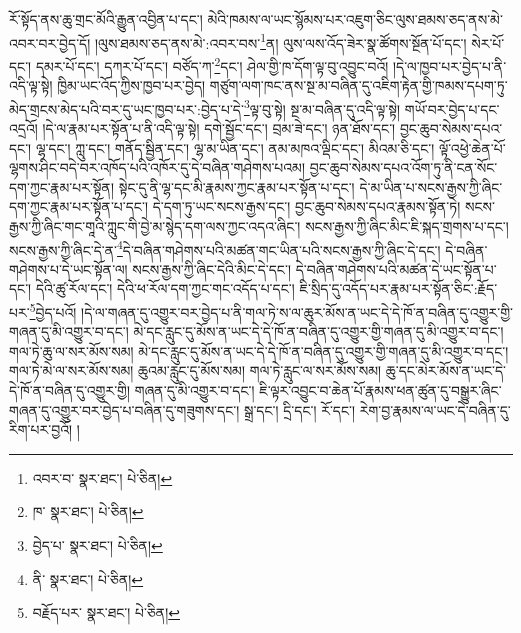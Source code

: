 རོ་སྟོད་ནས་ཆུ་གྲང་མོའི་རྒྱུན་འབྱིན་པ་དང་། མེའི་ཁམས་ལ་ཡང་སྙོམས་པར་འཇུག་ཅིང་ལུས་ཐམས་ཅད་ནས་མེ་འབར་བར་བྱེད་དོ། །ལུས་ཐམས་ཅད་ནས་མེ་:འབར་བས་\footnote{འབར་བ་  སྣར་ཐང་།  པེ་ཅིན། }ན། ལུས་ལས་འོད་ཟེར་སྣ་ཚོགས་སྔོན་པོ་དང་། སེར་པོ་དང་། དམར་པོ་དང་། དཀར་པོ་དང་། བཙོད་ཀ་\footnote{ཁ་  སྣར་ཐང་།  པེ་ཅིན། }དང་། ཤེལ་གྱི་ཁ་དོག་ལྟ་བུ་འབྱུང་བའོ། །དེ་ལ་ཁྱབ་པར་བྱེད་པ་ནི་འདི་ལྟ་སྟེ། ཁྱིམ་ཡང་འོད་ཀྱིས་ཁྱབ་པར་བྱེད། གཙུག་ལག་ཁང་ནས་སྔ་མ་བཞིན་དུ་འཇིག་རྟེན་གྱི་ཁམས་དཔག་ཏུ་མེད་གྲངས་མེད་པའི་བར་དུ་ཡང་ཁྱབ་པར་:བྱེད་པ་དེ་\footnote{བྱེད་པ་  སྣར་ཐང་།  པེ་ཅིན། }ལྟ་བུ་སྟེ། སྔ་མ་བཞིན་དུ་འདི་ལྟ་སྟེ། གཡོ་བར་བྱེད་པ་དང་འདྲའོ། །དེ་ལ་རྣམ་པར་སྟོན་པ་ནི་འདི་ལྟ་སྟེ། དགེ་སྦྱོང་དང་། བྲམ་ཟེ་དང་། ཉན་ཐོས་དང་། བྱང་ཆུབ་སེམས་དཔའ་དང་། ལྷ་དང་། ཀླུ་དང་། གནོད་སྦྱིན་དང་། ལྷ་མ་ཡིན་དང་། ནམ་མཁའ་ལྡིང་དང་། མིའམ་ཅི་དང་། ལྟོ་འཕྱེ་ཆེན་པོ་ལྷགས་ཤིང་བདེ་བར་འཁོད་པའི་འཁོར་དུ་དེ་བཞིན་གཤེགས་པའམ། བྱང་ཆུབ་སེམས་དཔའ་འོག་ཏུ་ནི་ངན་སོང་དག་ཀྱང་རྣམ་པར་སྟོན། སྟེང་དུ་ནི་ལྷ་དང་མི་རྣམས་ཀྱང་རྣམ་པར་སྟོན་པ་དང་། དེ་མ་ཡིན་པ་སངས་རྒྱས་ཀྱི་ཞིང་དག་ཀྱང་རྣམ་པར་སྟོན་པ་དང་། དེ་དག་ཏུ་ཡང་སངས་རྒྱས་དང་། བྱང་ཆུབ་སེམས་དཔའ་རྣམས་སྟོན་ཏེ། སངས་རྒྱས་ཀྱི་ཞིང་གང་གཱའི་ཀླུང་གི་བྱེ་མ་སྙེད་དག་ལས་ཀྱང་འདའ་ཞིང་། སངས་རྒྱས་ཀྱི་ཞིང་མིང་ཇི་སྐད་གྲགས་པ་དང་། སངས་རྒྱས་ཀྱི་ཞིང་དེ་ན་\footnote{ནི་  སྣར་ཐང་།  པེ་ཅིན། }དེ་བཞིན་གཤེགས་པའི་མཚན་གང་ཡིན་པའི་སངས་རྒྱས་ཀྱི་ཞིང་དེ་དང་། དེ་བཞིན་གཤེགས་པ་དེ་ཡང་སྟོན་ལ། སངས་རྒྱས་ཀྱི་ཞིང་དེའི་མིང་དེ་དང་། དེ་བཞིན་གཤེགས་པའི་མཚན་དེ་ཡང་སྟོན་པ་དང་། དེའི་ཚུ་རོལ་དང་། དེའི་ཕ་རོལ་དག་ཀྱང་གང་འདོད་པ་དང་། ཇི་སྲིད་དུ་འདོད་པར་རྣམ་པར་སྟོན་ཅིང་:རྗོད་པར་\footnote{བརྗོད་པར་  སྣར་ཐང་།  པེ་ཅིན། }བྱེད་པའོ། །དེ་ལ་གཞན་དུ་འགྱུར་བར་བྱེད་པ་ནི་གལ་ཏེ་ས་ལ་ཆུར་མོས་ན་ཡང་དེ་དེ་ཁོ་ན་བཞིན་དུ་འགྱུར་གྱི་གཞན་དུ་མི་འགྱུར་བ་དང་། མེ་དང་རླུང་དུ་མོས་ན་ཡང་དེ་དེ་ཁོ་ན་བཞིན་དུ་འགྱུར་གྱི་གཞན་དུ་མི་འགྱུར་བ་དང་། གལ་ཏེ་ཆུ་ལ་སར་མོས་སམ། མེ་དང་རླུང་དུ་མོས་ན་ཡང་དེ་དེ་ཁོ་ན་བཞིན་དུ་འགྱུར་གྱི་གཞན་དུ་མི་འགྱུར་བ་དང་། གལ་ཏེ་མེ་ལ་སར་མོས་སམ། ཆུའམ་རླུང་དུ་མོས་སམ། གལ་ཏེ་རླུང་ལ་སར་མོས་སམ། ཆུ་དང་མེར་མོས་ན་ཡང་དེ་དེ་ཁོ་ན་བཞིན་དུ་འགྱུར་གྱི། གཞན་དུ་མི་འགྱུར་བ་དང་། ཇི་ལྟར་འབྱུང་བ་ཆེན་པོ་རྣམས་ཕན་ཚུན་དུ་བསྒྱུར་ཞིང་གཞན་དུ་འགྱུར་བར་བྱེད་པ་བཞིན་དུ་གཟུགས་དང་། སྒྲ་དང་། དྲི་དང་། རོ་དང་། རེག་བྱ་རྣམས་ལ་ཡང་དེ་བཞིན་དུ་རིག་པར་བྱའོ། །
